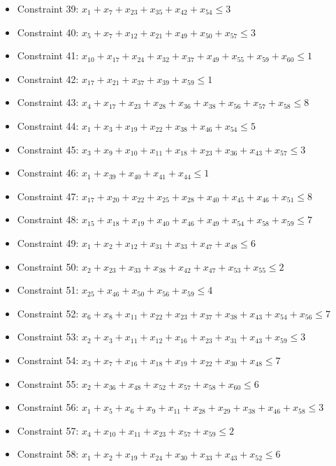 \documentclass[11pt]{article}
\begin{document}
\begin{itemize}
\item Constraint 39: $x_{1} + x_{7} + x_{23} + x_{35} + x_{42} + x_{54} \le 3$
\item Constraint 40: $x_{5} + x_{7} + x_{12} + x_{21} + x_{49} + x_{50} + x_{57} \le 3$
\item Constraint 41: $x_{10} + x_{17} + x_{24} + x_{32} + x_{37} + x_{49} + x_{55} + x_{59} + x_{60} \le 1$
\item Constraint 42: $x_{17} + x_{21} + x_{37} + x_{39} + x_{59} \le 1$
\item Constraint 43: $x_{4} + x_{17} + x_{23} + x_{28} + x_{36} + x_{38} + x_{56} + x_{57} + x_{58} \le 8$
\item Constraint 44: $x_{1} + x_{3} + x_{19} + x_{22} + x_{38} + x_{46} + x_{54} \le 5$
\item Constraint 45: $x_{3} + x_{9} + x_{10} + x_{11} + x_{18} + x_{23} + x_{36} + x_{43} + x_{57} \le 3$
\item Constraint 46: $x_{1} + x_{39} + x_{40} + x_{41} + x_{44} \le 1$
\item Constraint 47: $x_{17} + x_{20} + x_{22} + x_{25} + x_{28} + x_{40} + x_{45} + x_{46} + x_{51} \le 8$
\item Constraint 48: $x_{15} + x_{18} + x_{19} + x_{40} + x_{46} + x_{49} + x_{54} + x_{58} + x_{59} \le 7$
\item Constraint 49: $x_{1} + x_{2} + x_{12} + x_{31} + x_{33} + x_{47} + x_{48} \le 6$
\item Constraint 50: $x_{2} + x_{23} + x_{33} + x_{38} + x_{42} + x_{47} + x_{53} + x_{55} \le 2$
\item Constraint 51: $x_{25} + x_{46} + x_{50} + x_{56} + x_{59} \le 4$
\item Constraint 52: $x_{6} + x_{8} + x_{11} + x_{22} + x_{23} + x_{37} + x_{38} + x_{43} + x_{54} + x_{56} \le 7$
\item Constraint 53: $x_{2} + x_{3} + x_{11} + x_{12} + x_{16} + x_{23} + x_{31} + x_{43} + x_{59} \le 3$
\item Constraint 54: $x_{3} + x_{7} + x_{16} + x_{18} + x_{19} + x_{22} + x_{30} + x_{48} \le 7$
\item Constraint 55: $x_{2} + x_{36} + x_{48} + x_{52} + x_{57} + x_{58} + x_{60} \le 6$
\item Constraint 56: $x_{1} + x_{5} + x_{6} + x_{9} + x_{11} + x_{28} + x_{29} + x_{38} + x_{46} + x_{58} \le 3$
\item Constraint 57: $x_{4} + x_{10} + x_{11} + x_{23} + x_{57} + x_{59} \le 2$
\item Constraint 58: $x_{1} + x_{2} + x_{19} + x_{24} + x_{30} + x_{33} + x_{43} + x_{52} \le 6$

\end{itemize}
\end{document}
